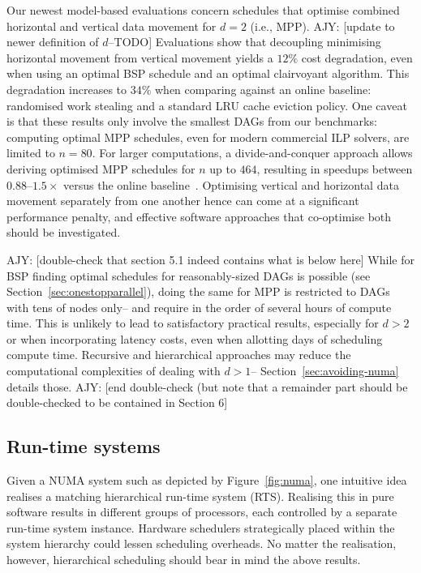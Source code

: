 \documentclass[oneside,reqno, a4paper]{amsart}
\numberwithin{equation}{section}
\newcommand{\ajy}[1]{{\color{orange} \sf AJY: [#1]}}
\begin{document}
Our newest model-based evaluations concern schedules that optimise combined horizontal and vertical data movement for $d=2$ (i.e., MPP).
\ajy{update to newer definition of $d$--TODO}
Evaluations show that decoupling minimising horizontal movement from vertical movement yields a $12\%$ cost degradation,
even when using an optimal BSP schedule and an optimal clairvoyant algorithm.
This degradation increases to $34\%$ when comparing against an online baseline:
randomised work stealing and a standard LRU cache eviction policy.
One caveat is that these results only involve the smallest DAGs from our benchmarks:
computing optimal MPP schedules,
even for modern commercial ILP solvers,
are limited to $n=80$.
For larger computations,
a divide-and-conquer approach allows deriving optimised MPP schedules for $n$ up to $464$,
resulting in speedups between $0.88$--$1.5\times$ versus the online baseline~\cite{multiBSP_opdas}.
Optimising vertical and horizontal data movement separately from one another hence can come at a significant performance penalty,
and effective software approaches that co-optimise both should be investigated.

\ajy{double-check that section 5.1 indeed contains what is below here}
While for BSP finding optimal schedules for reasonably-sized DAGs is possible %
(see Section~\ref{sec:onestopparallel}),
doing the same for MPP is restricted to DAGs with tens of nodes only--
and require in the order of several hours of compute time.
This is unlikely to lead to satisfactory practical results,
especially for $d>2$ or when incorporating latency costs,
even when allotting days of scheduling compute time. %
Recursive and hierarchical approaches may reduce the computational complexities of dealing with $d>1$--
Section~\ref{sec:avoiding-numa} details those.
\ajy{end double-check (but note that a remainder part should be double-checked to be contained in Section 6}

\subsection{Run-time systems}

Given a NUMA system such as depicted by Figure~\ref{fig:numa},
one intuitive idea realises a matching hierarchical run-time system (RTS).
Realising this in pure software results in different groups of processors,
each controlled by a separate run-time system instance.
Hardware schedulers strategically placed within the system hierarchy could lessen scheduling overheads.
No matter the realisation,
however,
hierarchical scheduling should bear in mind the above results.
\end{document}
